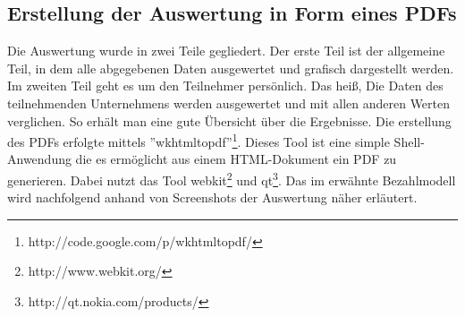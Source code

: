 \subsection{Erstellung der Auswertung in Form eines PDFs}
Die Auswertung wurde in zwei Teile gegliedert. Der erste Teil ist der 
allgemeine Teil, in dem alle abgegebenen Daten ausgewertet und grafisch
dargestellt werden. Im zweiten Teil geht es um den Teilnehmer persönlich. Das
heiß, Die Daten des teilnehmenden Unternehmens werden ausgewertet und mit allen
anderen Werten verglichen. So erhält man eine gute Übersicht über die
Ergebnisse. Die erstellung des PDFs erfolgte mittels
''wkhtmltopdf''\footnote{http://code.google.com/p/wkhtmltopdf/}. Dieses Tool
ist eine simple Shell-Anwendung die es ermöglicht aus einem HTML-Dokument ein
PDF zu generieren. Dabei nutzt das Tool webkit\footnote{http://www.webkit.org/}
und qt\footnote{http://qt.nokia.com/products/}. Das im
 erwähnte Bezahlmodell wird nachfolgend anhand von
Screenshots der Auswertung näher erläutert. 
